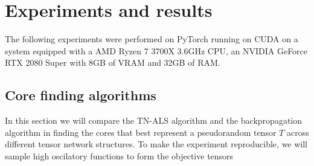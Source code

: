 \documentclass[11pt,a4paper,openright,oneside]{book}
\numberwithin{equation}{section}
\begin{document}
{

\normalfont


\newpage

\printbibliography

\appendix
\chapter{Experiments and results}

The following experiments were performed on PyTorch running on CUDA on a system
equipped with a AMD Ryzen 7 3700X 3.6GHz CPU, an NVIDIA GeForce RTX 2080 Super with 8GB of VRAM and
32GB of RAM.

\section{Core finding algorithms} \label{core-finding-algorithms}
In this section we will compare the TN-ALS algorithm and the backpropagation algorithm in finding the cores that
best represent a pseudorandom tensor $T$ across different tensor network structures. To make the experiment reproducible,
we will sample high oscilatory functions to form the objective tensors

\begin{figure}[H]


\end{figure}}
\end{document}
